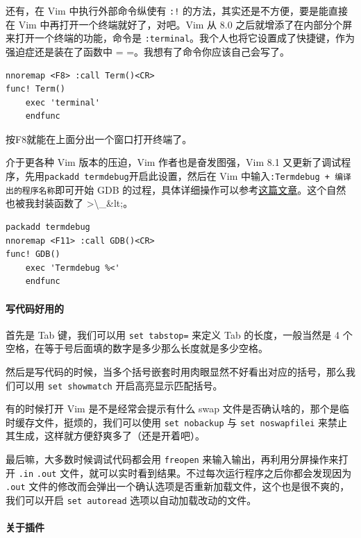 还有，在 Vim 中执行外部命令纵使有 \texttt{:!} 的方法，其实还是不方便，要是能直接在 Vim 中再打开一个终端就好了，对吧。Vim 从 8.0 之后就增添了在内部分个屏来打开一个终端的功能，命令是 \texttt{:terminal}。我个人也将它设置成了快捷键，作为强迫症还是装在了函数中 = =。我想有了命令你应该自己会写了。

\begin{verbatim}
nnoremap <F8> :call Term()<CR>
func! Term()
    exec 'terminal'
    endfunc
\end{verbatim}

按F8就能在上面分出一个窗口打开终端了。

介于更各种 Vim 版本的压迫，Vim 作者也是奋发图强，Vim 8.1 又更新了调试程序，先用\texttt{packadd termdebug}开启此设置，然后在 Vim 中输入\texttt{:Termdebug + 编译出的程序名称}即可开始 GDB 的过程，具体详细操作可以参考\href{https://fzheng.me/2018/05/28/termdebug/}{这篇文章}。这个自然也被我封装函数了 >\textbackslash{}\_\&lt;。

\begin{verbatim}
packadd termdebug
nnoremap <F11> :call GDB()<CR>
func! GDB()
    exec 'Termdebug %<'
    endfunc       
\end{verbatim}

\paragraph{写代码好用的}

首先是 Tab 键，我们可以用 \texttt{set tabstop=} 来定义 Tab 的长度，一般当然是 4 个空格，在等于号后面填的数字是多少那么长度就是多少空格。

然后是写代码的时候，当多个括号嵌套时用肉眼显然不好看出对应的括号，那么我们可以用 \texttt{set showmatch} 开启高亮显示匹配括号。

有的时候打开 Vim 是不是经常会提示有什么 swap 文件是否确认啥的，那个是临时缓存文件，挺烦的，我们可以使用 \texttt{set nobackup} 与 \texttt{set noswapfilei} 来禁止其生成，这样就方便舒爽多了（还是开着吧）。

最后嘛，大多数时候调试代码都会用 \texttt{freopen} 来输入输出，再利用分屏操作来打开 \texttt{.in} \texttt{.out} 文件，就可以实时看到结果。不过每次运行程序之后你都会发现因为 \texttt{.out} 文件的修改而会弹出一个确认选项是否重新加载文件，这个也是很不爽的，我们可以开启 \texttt{set autoread} 选项以自动加载改动的文件。

\paragraph{关于插件}

